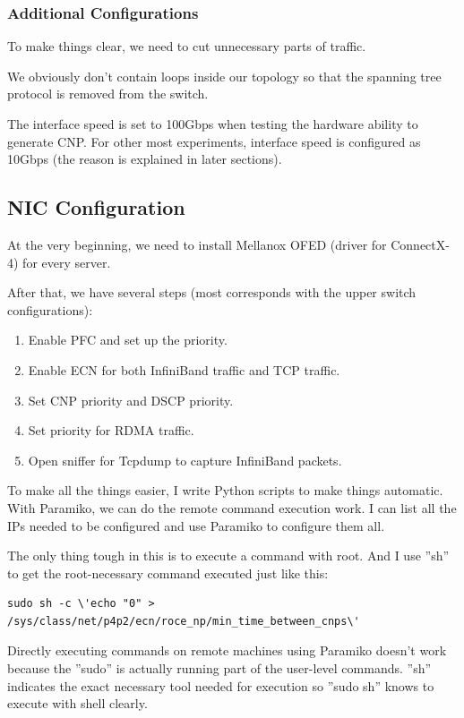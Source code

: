 \documentclass[12pt,a4paper]{article}
\begin{document}
\subsubsection{Additional Configurations}
To make things clear, we need to cut unnecessary parts of traffic.

We obviously don't contain loops inside our topology so that the spanning tree protocol is removed from the switch.

The interface speed is set to 100Gbps when testing the hardware ability to generate CNP.
For other most experiments, interface speed is configured as 10Gbps (the reason is explained in later sections).

\subsection{NIC Configuration}
At the very beginning, we need to install Mellanox OFED (driver for ConnectX-4) for every server.

After that, we have several steps (most corresponds with the upper switch configurations):
\begin{enumerate}
	\item Enable PFC and set up the priority.
	\item Enable ECN for both InfiniBand traffic and TCP traffic.
	\item Set CNP priority and DSCP priority.
	\item Set priority for RDMA traffic.
	\item Open sniffer for Tcpdump \cite{Tcpdump} to capture InfiniBand packets.
\end{enumerate}

To make all the things easier, I write Python scripts to make things automatic.
With Paramiko, we can do the remote command execution work.
I can list all the IPs needed to be configured and use Paramiko to configure them all.

The only thing tough in this is to execute a command with root.
And I use ''sh'' to get the root-necessary command executed just like this:
\begin{lstlisting}
sudo sh -c \'echo "0" > /sys/class/net/p4p2/ecn/roce_np/min_time_between_cnps\'
\end{lstlisting}

Directly executing commands on remote machines using Paramiko doesn't work because the ''sudo'' is actually running part of
the user-level commands.
''sh'' indicates the exact necessary tool needed for execution so ''sudo sh'' knows to execute with shell clearly.
\end{document}
